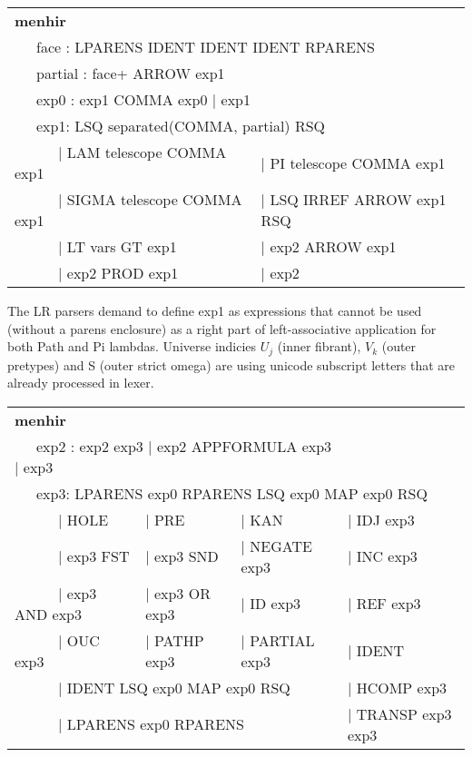 \documentclass[a4paper,UKenglish,cleveref, autoref, thm-restate]{lipics-v2021}
\begin{document}
\begin{table}[ht]
\begin{tabular}{ll}
\textbf{menhir} \\
\multicolumn{2}{l}{\ \ \ face : LPARENS IDENT IDENT IDENT RPARENS } \\
\multicolumn{2}{l}{\ \ \ partial : face+ ARROW exp1 } \\
\multicolumn{2}{l}{\ \ \ exp0 : exp1 COMMA exp0 | exp1 } \\
\multicolumn{2}{l}{\ \ \ exp1: LSQ separated(COMMA, partial) RSQ } \\
\ \ \ \ \ \ | LAM telescope COMMA exp1   & | PI telescope COMMA exp1 \\
\ \ \ \ \ \ | SIGMA telescope COMMA exp1 & | LSQ IRREF ARROW exp1 RSQ \\
\ \ \ \ \ \ | LT vars GT exp1            & | exp2 ARROW exp1 \\
\ \ \ \ \ \ | exp2 PROD exp1             & | exp2 \\
\end{tabular}
\end{table}

The LR parsers demand to define exp1 as expressions that cannot be used (without a parens enclosure) as a right part of left-associative application for both Path and Pi lambdas.
Universe indicies $U_j$ (inner fibrant), $V_k$ (outer pretypes) and S (outer strict omega) are using unicode subscript letters that are already processed in lexer.

\begin{table}[ht!]
\begin{tabular}{llll}
\textbf{menhir} \\
\multicolumn{3}{l}{\ \ \ exp2 : exp2 exp3 | exp2 APPFORMULA exp3 | exp3 } \\
\multicolumn{4}{l}{\ \ \ exp3: LPARENS exp0 RPARENS LSQ exp0 MAP exp0 RSQ } \\
\ \ \ \ \ \   | HOLE              & | PRE          & | KAN          & | IDJ exp3 \\
\ \ \ \ \ \   | exp3 FST          & | exp3 SND     & | NEGATE exp3  & | INC exp3 \\
\ \ \ \ \ \   | exp3 AND exp3     & | exp3 OR exp3 & | ID exp3      & | REF exp3\\
\ \ \ \ \ \   | OUC exp3          & | PATHP exp3   & | PARTIAL exp3 & | IDENT \\
\multicolumn{3}{l}{\ \ \ \ \ \    | IDENT LSQ exp0 MAP exp0 RSQ }   & | HCOMP exp3 \\
\multicolumn{3}{l}{\ \ \ \ \ \    | LPARENS exp0 RPARENS }          & | TRANSP exp3 exp3 \\
\end{tabular}
\end{table}
\end{document}
